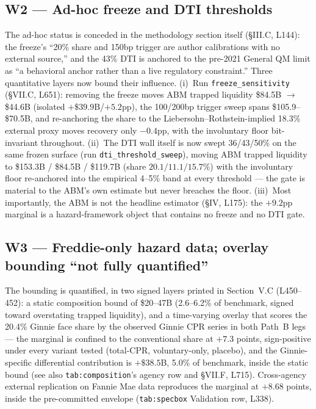 \documentclass[11pt]{article}
\newcommand{\mlabel}[1]{\texttt{#1}}
\newcommand{\run}[1]{\texttt{#1}}
\begin{document}
\subsection*{W2 --- Ad-hoc freeze and DTI thresholds}

The ad-hoc status is conceded in the methodology section itself (\S III.C,
L144): the freeze's ``20\% share and 150bp trigger are author calibrations
with no external source,'' and the 43\% DTI is anchored to the pre-2021
General QM limit as ``a behavioral anchor rather than a live regulatory
constraint.'' Three quantitative layers now bound their influence.
(i)~Run \run{freeze\_sensitivity} (\S VII.C, L651): removing the freeze moves
ABM trapped liquidity \$84.5B $\to$ \$44.6B (isolated $+\$39.9$B/$+5.2$pp),
the 100/200bp trigger sweep spans \$105.9--\$70.5B, and re-anchoring the share
to the Liebersohn--Rothstein-implied 18.3\% external proxy moves recovery only
$-0.4$pp, with the involuntary floor bit-invariant throughout. (ii)~The DTI
wall itself is now swept 36/43/50\% on the same frozen surface
(run \run{dti\_threshold\_sweep}), moving ABM trapped liquidity to \$153.3B /
\$84.5B / \$119.7B (share $20.1/11.1/15.7\%$) with the involuntary floor
re-anchored into the empirical 4--5\% band at every threshold --- the gate is
material to the ABM's own estimate but never breaches the floor.
(iii)~Most importantly, the ABM is not the headline estimator (\S IV, L175):
the $+9.2$pp marginal is a hazard-framework object that contains no freeze and
no DTI gate.

\subsection*{W3 --- Freddie-only hazard data; overlay bounding ``not fully quantified''}

The bounding is quantified, in two signed layers printed in Section~V.C
(L450--452): a static composition bound of \$20--47B (2.6--6.2\% of benchmark,
signed toward overstating trapped liquidity), and a time-varying overlay that
scores the 20.4\% Ginnie face share by the observed Ginnie CPR series in both
Path~B legs --- the marginal is confined to the conventional share at $+7.3$
points, sign-positive under every variant tested (total-CPR, voluntary-only,
placebo), and the Ginnie-specific differential contribution is $+\$38.5$B,
5.0\% of benchmark, inside the static bound (see also \mlabel{tab:composition}'s
agency row and \S VII.F, L715). Cross-agency external replication on Fannie
Mae data reproduces the marginal at $+8.68$ points, inside the pre-committed
envelope (\mlabel{tab:specbox} Validation row, L338).
\end{document}
